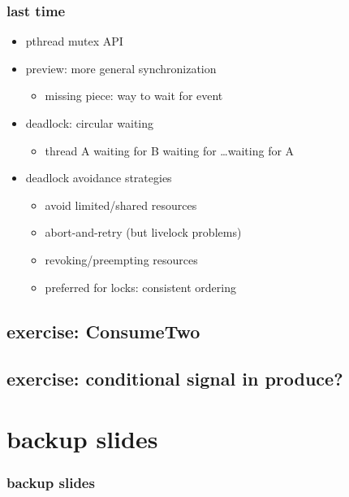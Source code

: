 \date{}
\title{}
\date{}

\begin{frame}
    \titlepage
\end{frame}



\begin{frame}
\frametitle{last time}
    \begin{itemize}
    \item pthread mutex API
    \item preview: more general synchronization
        \begin{itemize}
        \item missing piece: way to wait for event
        \end{itemize}
    \item deadlock: circular waiting
        \begin{itemize}
        \item thread A waiting for B waiting for \ldots waiting for A
        \end{itemize}
    \item deadlock avoidance strategies
        \begin{itemize}
        \item avoid limited/shared resources
        \item abort-and-retry (but livelock problems)
        \item revoking/preempting resources
        \item preferred for locks: consistent ordering
        \end{itemize}
    \end{itemize}
\end{frame}




\subsection{exercise: ConsumeTwo}


\subsection{exercise: conditional signal in produce?}






\section{backup slides}
\begin{frame}\frametitle{backup slides}
\end{frame}




%

